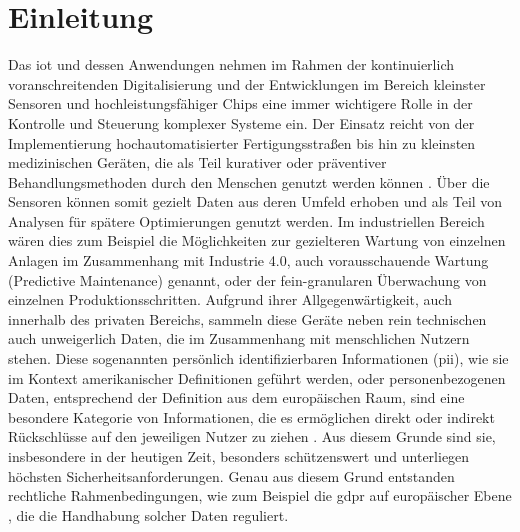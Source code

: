 
\section{Einleitung}
\label{sec:Einleitung}

Das \ac{iot} und dessen Anwendungen nehmen im Rahmen der kontinuierlich voranschreitenden Digitalisierung und der Entwicklungen im Bereich kleinster Sensoren und hochleistungsfähiger Chips eine immer wichtigere Rolle in der Kontrolle und Steuerung komplexer Systeme ein.
Der Einsatz reicht von der Implementierung hochautomatisierter Fertigungsstraßen \cite{Kim2017} bis hin zu kleinsten medizinischen Geräten, die als Teil kurativer oder präventiver Behandlungsmethoden durch den Menschen genutzt werden können \cite{Selvaraj2020}.
Über die Sensoren können somit gezielt Daten aus deren Umfeld erhoben und als Teil von Analysen für spätere Optimierungen genutzt werden. Im industriellen Bereich wären dies zum Beispiel die Möglichkeiten zur gezielteren Wartung von einzelnen Anlagen im Zusammenhang mit Industrie 4.0, auch vorausschauende Wartung (Predictive Maintenance) \cite{Compare2020} genannt, oder der fein-granularen Überwachung von einzelnen Produktionsschritten.
Aufgrund ihrer Allgegenwärtigkeit, auch innerhalb des privaten Bereichs, sammeln diese Geräte neben rein technischen auch unweigerlich Daten, die im Zusammenhang mit menschlichen Nutzern stehen.
Diese sogenannten persönlich identifizierbaren Informationen (\acs{pii}), wie sie im Kontext amerikanischer Definitionen geführt werden, oder personenbezogenen Daten, entsprechend der Definition aus dem europäischen Raum, sind eine besondere Kategorie von Informationen, die es ermöglichen direkt oder indirekt Rückschlüsse auf den jeweiligen Nutzer zu ziehen \cite{DSGVOArt4}. Aus diesem Grunde sind sie, insbesondere in der heutigen Zeit, besonders schützenswert und unterliegen höchsten Sicherheitsanforderungen.
Genau aus diesem Grund entstanden rechtliche Rahmenbedingungen, wie zum Beispiel die \ac{gdpr} auf europäischer Ebene \cite{Dsgvo2016}, die die Handhabung solcher Daten reguliert.


